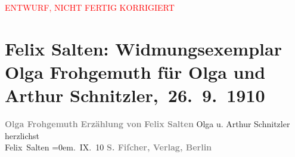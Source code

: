 
\begin{center}
            \textcolor{red}{ENTWURF, NICHT FERTIG KORRIGIERT}
                      \end{center}
            
         
         \renewcommand{\erwaehntePersonen}{Personen: Olga Schnitzler}
         \renewcommand{\erwaehnteInstitutionen}{Institutionen: S. Fischer Verlag}
         \renewcommand{\erwaehnteOrte}{Orte: Berlin, Wien}
         \renewcommand{\erwaehnteWerke}{Werke: Olga Frohgemuth. Erzählung}
               \section[ Felix Salten: Widmungsexemplar Olga Frohgemuth für Olga und Arthur Schnitzler, 26. 9. 1910]{ Felix Salten: Widmungsexemplar Olga Frohgemuth für Olga und Arthur
               Schnitzler, 26. 9. 1910}\nopagebreak{}\rehead{ }\begin{ledgroupsized}[t]{13cm}\normalsize\beginnumbering \toendnotes[C]{\smallbreak\pagebreak[2]} 
\pstart
           \noindent{}\centering{}{\pb}\textcolor{gray}{\textbf{Olga Frohgemuth}}\pend
           \pstart
           \noindent{}\centering{}\textcolor{gray}{\textbf{Erzählung von}}\pend
           \pstart
           \noindent{}\centering{}\textcolor{gray}{\textbf{Felix Salten}}\pend
           {\bigskip}\pstart
           \noindent{}Olga u. Arthur Schnitzler\pend
           \pstart
           herzlichst{\\[\baselineskip]}\spacefill\mbox{Felix Salten}\pend
           \leftskip=0em{}. IX. 10\pend
           {\bigskip}\pstart
           \noindent{}\centering{}\textcolor{gray}{\textbf{S. Fiſcher, Verlag, Berlin}}\pend
           
         
         \endnumbering{}\end{ledgroupsized}  \newcommand{\dateiname}{L03047}\newcommand{\titel}{Felix Salten: Widmungsexemplar Olga Frohgemuth für Olga und Arthur Schnitzler, 26. 9. 1910}\newcommand{\editorInnen}{Martin Anton Müller und Laura Untner}
      